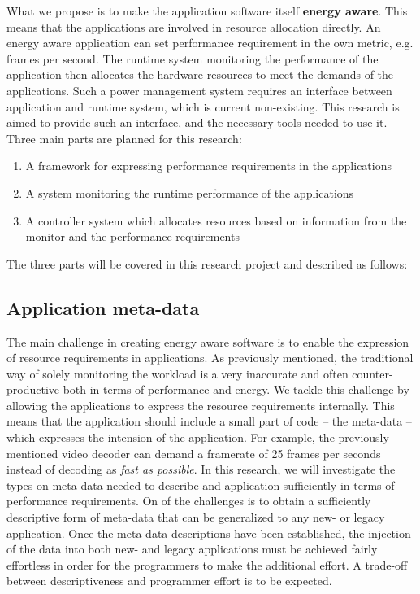 \documentclass{article}
\begin{document}
What we propose is to make the application software itself \textbf{energy aware}.
This means that the applications are involved in resource allocation directly.
An energy aware application can set performance requirement in the own metric, e.g. frames per second.
The runtime system monitoring the performance of the application then allocates the hardware resources to meet the demands of the applications.
Such a power management system requires an interface between application and runtime system, which is current non-existing.
This research is aimed to provide such an interface, and the necessary tools needed to use it.
Three main parts are planned for this research:
\begin{enumerate}
 \item A framework for expressing performance requirements in the applications
 \item A system monitoring the runtime performance of the applications
 \item A controller system which allocates resources based on information from the monitor and the performance requirements
\end{enumerate}
The three parts will be covered in this research project and described as follows:

\subsection{Application meta-data}
The main challenge in creating energy aware software is to enable the expression of resource requirements in applications.
As previously mentioned, the traditional way of solely monitoring the workload is a very inaccurate and often counter-productive both in terms of performance and energy.
We tackle this challenge by allowing the applications to express the resource requirements internally.
This means that the application should include a small part of code -- the meta-data -- which expresses the intension of the application.
For example, the previously mentioned video decoder can demand a framerate of 25 frames per seconds instead of decoding as \textit{fast as possible}.
In this research, we will investigate the types on meta-data needed to describe and application sufficiently in terms of performance requirements.
On of the challenges is to obtain a sufficiently descriptive form of meta-data that can be generalized to any new- or legacy application.
Once the meta-data descriptions have been established, the injection of the data into both new- and legacy applications must be achieved fairly effortless in order for the programmers to make the additional effort.
A trade-off between descriptiveness and programmer effort is to be expected.
\end{document}
